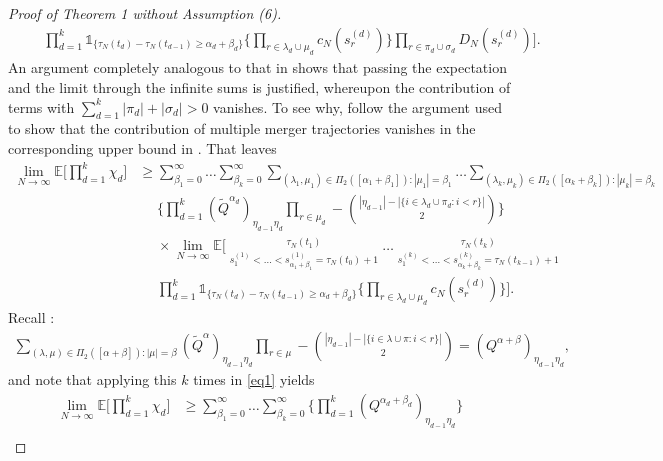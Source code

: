 \documentclass[a4paper,11pt]{article}
\theoremstyle{definition}
\newcommand{\E}{\mathbb{E}}
\newcommand{\1}{\mathds{1}}
\newcommand{\osum}{\mathop{\sum\nolimits^{\phantom{}_{\star}}}\limits}
\begin{document}
\begin{proof}[Proof of Theorem 1 without Assumption (6)]
\begin{align*}
&\phantom{\geq} \prod_{ d = 1 }^k \mathds{ 1 }_{ \{ \tau_N( t_d ) - \tau_N( t_{ d - 1 } ) \geq \alpha_d + \beta_d \} } \Bigg\{ \prod_{ r \in \lambda_d \cup \mu_d } c_N( s_r^{ ( d ) } ) \Bigg\} \prod_{ r \in \pi_d \cup \sigma_d }  D_N( s_r^{ ( d ) } ) \Bigg].
\end{align*}
An argument completely analogous to that in \cite[Appendix]{Koskela19} shows that passing the expectation and the limit through the infinite sums is justified, whereupon the contribution of terms with $ \sum_{ d = 1 }^k | \pi_d | + | \sigma_d | > 0$ vanishes.
To see why, follow the argument used to show that the contribution of multiple merger trajectories vanishes in the corresponding upper bound in \cite{Koskela19}.
That leaves
\begin{align}
\lim_{ N \rightarrow \infty } \E\Bigg[ \prod_{ d = 1 }^k \chi_d \Bigg] &\geq \sum_{ \beta_1 = 0 }^{ \infty } \ldots \sum_{ \beta_k = 0 }^{ \infty } \sum_{ ( \lambda_1, \mu_1 ) \in \Pi_2( [ \alpha_1 + \beta_1 ] ) : | \mu_1 | = \beta_1 } \ldots \sum_{ ( \lambda_k, \mu_k ) \in \Pi_2( [ \alpha_k + \beta_k ] ) : | \mu_k | = \beta_k } \nonumber \\
&\phantom{\geq} \Bigg\{ \prod_{ d = 1 }^k ( \tilde{ Q }^{ \alpha_d } )_{ \eta_{ d - 1 } \eta_d } \prod_{ r \in \mu_d } - \binom{ | \eta_{ d - 1 } | - | \{ i \in \lambda_d \cup \pi_d : i < r \} | }{ 2 } \Bigg\} \nonumber \\
&\phantom{\geq} \times \lim_{ N \rightarrow \infty } \E\Bigg[ \osum_{ s_1^{ ( 1 ) } < \ldots < s_{ \alpha_1 + \beta_1 }^{ ( 1 ) } = \tau_N( t_0 ) + 1 }^{ \tau_N( t_1 ) } \ldots \osum_{ s_1^{ ( k ) } < \ldots < s_{ \alpha_k + \beta_k }^{ ( k ) } = \tau_N( t_{ k - 1 } ) + 1 }^{ \tau_N( t_k ) } \nonumber \\
&\phantom{\geq} \prod_{ d = 1 }^k \mathds{ 1 }_{ \{ \tau_N( t_d ) - \tau_N( t_{ d - 1 } ) \geq \alpha_d + \beta_d \} } \Bigg\{ \prod_{ r \in \lambda_d \cup \mu_d } c_N( s_r^{ ( d ) } ) \Bigg\} \Bigg]. \label{eq1}
\end{align}
Recall \cite[Eq (11)]{Koskela19}:
\begin{align*}
\sum_{ ( \lambda, \mu ) \in \Pi_2( [ \alpha + \beta ] ) : | \mu | = \beta } ( \tilde{ Q }^{ \alpha } )_{ \eta_{ d - 1 } \eta_d } \prod_{ r \in \mu } - \binom{ | \eta_{ d - 1 } | - | \{ i \in \lambda \cup \pi : i < r \} | }{ 2 } = ( Q^{ \alpha + \beta } )_{ \eta_{ d - 1 } \eta_d },
\end{align*}
and note that applying this $k$ times in \eqref{eq1} yields
\begin{align*}
\lim_{ N \rightarrow \infty } \E\Bigg[ \prod_{ d = 1 }^k \chi_d \Bigg] &\geq \sum_{ \beta_1 = 0 }^{ \infty } \ldots \sum_{ \beta_k = 0 }^{ \infty } \Bigg\{ \prod_{ d = 1 }^k ( Q^{ \alpha_d + \beta_d } )_{ \eta_{ d - 1 } \eta_d } \Bigg\} \\

\end{align*}
\end{proof}
\end{document}
